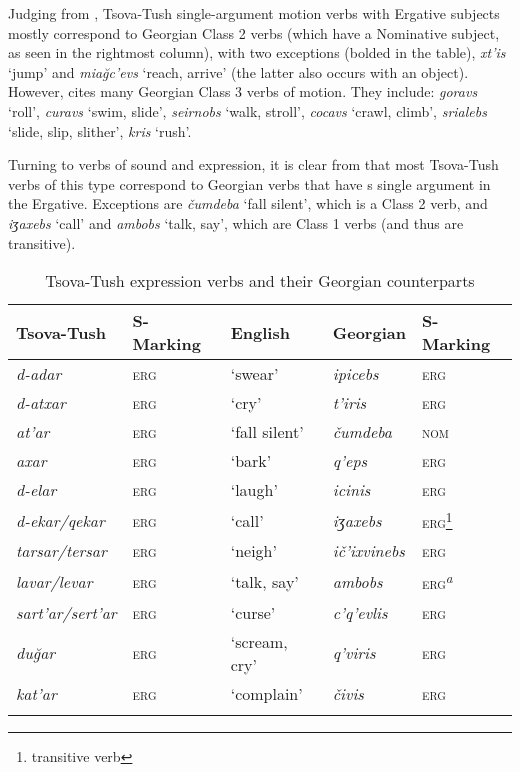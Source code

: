 Judging from , Tsova-Tush single-argument motion verbs with Ergative subjects mostly correspond to Georgian Class 2 verbs (which have a Nominative subject, as seen in the rightmost column), with two exceptions (bolded in the table), \textit{xt'is} `jump' and \textit{mia\u{g}c'evs} `reach, arrive' (the latter also occurs with an object). However, \textcites[111]{holisky1981medial} cites many Georgian Class 3 verbs of motion. They include: \textit{goravs} `roll', \textit{curavs} `swim, slide', \textit{seirnobs} `walk, stroll', \textit{cocavs} `crawl, climb', \textit{srialebs} `slide, slip, slither', \textit{kris} `rush'.

Turning to verbs of sound and expression, it is clear from  that most Tsova-Tush verbs of this type correspond to Georgian verbs that have s single argument in the Ergative. Exceptions are \textit{čumdeba} `fall silent', which is a Class 2 verb, and \textit{iʒaxebs} `call' and \textit{ambobs} `talk, say', which are Class 1 verbs (and thus are transitive). 

\begin{table}
\begin{tabular}{lllll}
\lsptoprule
	Tsova-Tush & {S-Marking} & {English} & {Georgian} & {S-Marking} \\
	\midrule
	\textit{d-adar} & \textsc{erg} & `swear' & \textit{ipicebs} & \textsc{erg} \\
	\textit{d-atxar} & \textsc{erg} & `cry' & \textit{t'iris} & \textsc{erg} \\
	\textit{at'ar} & \textsc{erg} & `fall silent'  & \textit{čumdeba} &  \textsc{nom} \\
	\textit{axar} & \textsc{erg} & `bark' & \textit{q'eps} & \textsc{erg} \\
	\textit{d-elar} & \textsc{erg} & `laugh' & \textit{icinis} & \textsc{erg} \\
	\textit{d-ekar/qekar} & \textsc{erg} & `call' & \textit{iʒaxebs} & \textsc{erg}\footnote{transitive verb} \\
	\textit{tarsar/tersar} & \textsc{erg} & `neigh' & \textit{ič'ixvinebs} & \textsc{erg} \\
	\textit{lavar/levar} & \textsc{erg} & `talk, say' & \textit{ambobs} & \textsc{erg}\textsuperscript{\textit{a}} \\
	\textit{sart'ar/sert'ar} & \textsc{erg} & `curse' & \textit{c'q'evlis} & \textsc{erg} \\
	\textit{du\u{g}ar} & \textsc{erg} & `scream, cry' & \textit{q'viris} & \textsc{erg} \\
	\textit{kat'ar} & \textsc{erg} & `complain' & \textit{čivis} & \textsc{erg} \\
	\lspbottomrule
\end{tabular}
\caption{Tsova-Tush expression verbs and their Georgian counterparts}
\label{verbderiv-table-sound}
\end{table}




